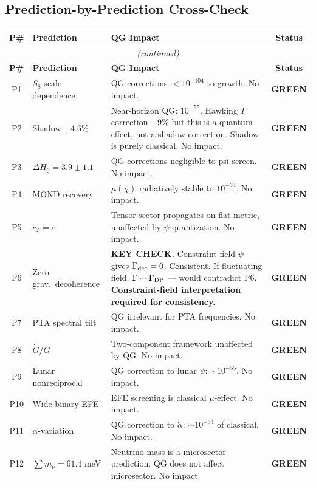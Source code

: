 \documentclass[11pt,a4paper]{article}
\newcommand{\GREEN}{\textcolor{dfdgreen}{\textbf{GREEN}}}
\begin{document}
\subsection{Prediction-by-Prediction Cross-Check}
\label{sec:prediction-check}

\begin{center}
\begin{longtable}{clp{6cm}c}
\toprule
\textbf{P\#} & \textbf{Prediction} & \textbf{QG Impact} & \textbf{Status} \\
\midrule
\endfirsthead
\multicolumn{4}{c}{\textit{(continued)}} \\
\toprule
\textbf{P\#} & \textbf{Prediction} & \textbf{QG Impact} & \textbf{Status} \\
\midrule
\endhead
P1 & $S_8$ scale dependence & QG corrections $< 10^{-104}$ to growth. No impact. & \GREEN \\
P2 & Shadow $+4.6\%$ & Near-horizon QG: $10^{-55}$. Hawking $T$ correction $-9\%$ but this is a quantum effect, not a shadow correction. Shadow is purely classical. No impact. & \GREEN \\
P3 & $\Delta H_0 = 3.9\pm1.1$ & QG corrections negligible to psi-screen. No impact. & \GREEN \\
P4 & MOND recovery & $\mu(\chi)$ radiatively stable to $10^{-34}$. No impact. & \GREEN \\
P5 & $c_T = c$ & Tensor sector propagates on flat metric, unaffected by $\psi$-quantization. No impact. & \GREEN \\
P6 & Zero grav.\ decoherence & \textbf{KEY CHECK.} Constraint-field $\psi$ gives $\Gamma_{\rm dec} = 0$. Consistent. If fluctuating field, $\Gamma \sim \Gamma_{\rm DP}$ --- would contradict P6. \textbf{Constraint-field interpretation required for consistency.} & \GREEN \\
P7 & PTA spectral tilt & QG irrelevant for PTA frequencies. No impact. & \GREEN \\
P8 & $\dot{G}/G$ & Two-component framework unaffected by QG. No impact. & \GREEN \\
P9 & Lunar nonreciprocal & QG correction to lunar $\psi$: $\sim 10^{-55}$. No impact. & \GREEN \\
P10 & Wide binary EFE & EFE screening is classical $\mu$-effect. No impact. & \GREEN \\
P11 & $\alpha$-variation & QG correction to $\dot\alpha$: $\sim 10^{-34}$ of classical. No impact. & \GREEN \\
P12 & $\sum m_\nu = 61.4$ meV & Neutrino mass is a microsector prediction. QG does not affect microsector. No impact. & \GREEN \\

\end{longtable}
\end{center}
\end{document}
